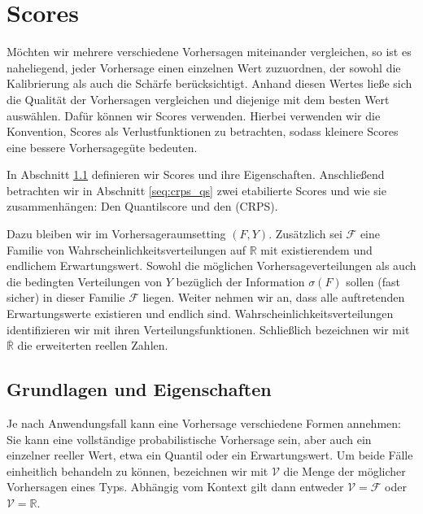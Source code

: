 \chapter{Scores}\label{chap:scoring}
Möchten wir mehrere verschiedene Vorhersagen miteinander vergleichen, so ist es naheliegend, jeder Vorhersage einen einzelnen Wert zuzuordnen, der sowohl die Kalibrierung als auch die Schärfe berücksichtigt. Anhand diesen Wertes ließe sich die Qualität der Vorhersagen vergleichen und diejenige mit dem besten Wert auswählen. Dafür können wir Scores verwenden. Hierbei verwenden wir die Konvention, Scores als Verlustfunktionen zu betrachten, sodass kleinere Scores eine bessere Vorhersagegüte bedeuten. 

In Abschnitt \ref{seq:score_propertiers} definieren wir Scores und ihre Eigenschaften. Anschließend betrachten wir in Abschnitt \ref{seq:crps_qs} zwei etabilierte Scores und wie sie zusammenhängen: Den Quantilscore und den \TCRPS \;(CRPS).

Dazu bleiben wir im Vorhersageraumsetting $(F,Y)$. Zusätzlich sei $\mathcal F$ eine Familie von Wahrscheinlichkeitsverteilungen auf $\mathbb R$ mit existierendem und endlichem Erwartungswert. Sowohl die möglichen Vorhersageverteilungen als auch die bedingten Verteilungen von $Y$ bezüglich der Information $\sigma(F)$ sollen (fast sicher) in dieser Familie $\mathcal F$ liegen. Weiter nehmen wir an, dass alle auftretenden Erwartungswerte existieren und endlich sind. Wahrscheinlichkeitsverteilungen identifizieren wir mit ihren Verteilungsfunktionen. Schließlich  bezeichnen wir mit $\overline{\mathbb R}$ die erweiterten reellen Zahlen.

\section{Grundlagen und Eigenschaften} \label{seq:score_propertiers}
Je nach Anwendungsfall kann eine Vorhersage verschiedene Formen annehmen: Sie kann eine vollständige probabilistische Vorhersage sein, aber auch ein einzelner reeller Wert, etwa ein Quantil oder ein Erwartungswert. Um beide Fälle einheitlich behandeln zu können, bezeichnen wir mit $\mathcal{V}$ die Menge der möglicher Vorhersagen eines Typs. Abhängig vom Kontext gilt dann entweder $\mathcal{V} = \mathcal{F}$ oder $\mathcal{V} = \mathbb{R}$.

